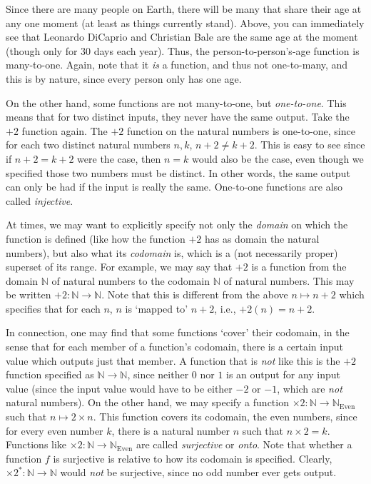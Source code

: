Since there are many people on Earth, there will be many that share their age at any one moment (at least as things currently stand). Above, you can immediately see that Leonardo DiCaprio and Christian Bale are the same age at the moment (though only for 30 days each year). Thus, the person-to-person's-age function is many-to-one. Again, note that it \textit{is} a function, and thus not one-to-many, and this is by nature, since every person only has one age.

On the other hand, some functions are not many-to-one, but \textit{one-to-one}. This means that for two distinct inputs, they never have the same output. Take the $+2$ function again. The $+2$ function on the natural numbers is one-to-one, since for each two distinct natural numbers $n, k$, $n+2\neq k+2$. This is easy to see since if $n+2=k+2$ were the case, then $n=k$ would also be the case, even though we specified those two numbers must be distinct. In other words, the same output can only be had if the input is really the same. One-to-one functions are also called \textit{injective}. 

At times, we may want to explicitly specify not only the \textit{domain} on which the function is defined (like how the function $+2$ has as domain the natural numbers), but also what its \textit{codomain} is, which is a (not necessarily proper) superset of its range. For example, we may say that $+2$ is a function from the domain $\mathbb{N}$ of natural numbers to the codomain $\mathbb{N}$ of natural numbers. This may be written $+2: \mathbb{N} \to \mathbb{N}$. Note that this is different from the above $n \mapsto n+2$ which specifies that for each $n$, $n$ is `mapped to' $n+2$, i.e., $+2(n)=n+2$. 

In connection, one may find that some functions `cover' their codomain, in the sense that for each member of a function's codomain, there is a certain input value which outputs just that member. A function that is \textit{not} like this is the $+2$ function specified as $\mathbb{N} \to \mathbb{N}$, since neither $0$ nor $1$ is an output for any input value (since the input value would have to be either $-2$ or $-1$, which are \textit{not} natural numbers). On the other hand, we may specify a function $\times2: \mathbb{N} \to \mathbb{N}_\text{Even}$ such that $n \mapsto 2\times n$. This function covers its codomain, the even numbers, since for every even number $k$, there is a natural number $n$ such that $n \times 2=k$. Functions like $\times 2: \mathbb{N} \to \mathbb{N}_\text{Even}$ are called \textit{surjective} or \textit{onto}. Note that whether a function $f$ is surjective is relative to how its codomain is specified. Clearly, $\times 2^*: \mathbb{N} \to \mathbb{N}$ would \textit{not} be surjective, since no odd number ever gets output. 

